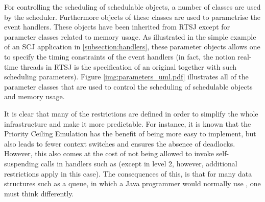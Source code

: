 For controlling the scheduling of schedulable objects, a number of classes are used by the scheduler. Furthermore objects of these classes are used to parametrise the event handlers. These objects have been inherited from RTSJ except for parameter classes related to memory usage. As illustrated in the simple example of an SCJ application in \ref{subsection:handlers}, these parameter objects allows one to specify the timing constraints of the event handlers (in fact, the notion real-time threads in RTSJ is the specification of an original  together with such scheduling parameters). Figure \ref{img:parameters_uml.pdf} illustrates all of the parameter classes that are used to control the scheduling of schedulable objects and memory usage.


It is clear that many of the restrictions are defined in order to simplify the whole infrastructure and make it more predictable. For instance, it is known that the Priority Ceiling Emulation has the benefit of being more easy to implement, but also leads to fewer context switches and ensures the absence of deadlocks\cite{alan2001real}. However, this also comes at the cost of not being allowed to invoke self-suspending calls in handlers such as  (except in level 2, however, additional restrictions apply in this case). The consequences of this, is that for many data structures such as a queue, in which a Java programmer would normally use , one must think differently.

